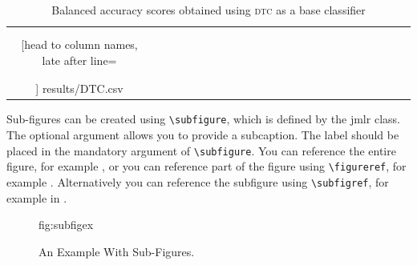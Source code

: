 \documentclass[pmlr]{jmlr}
\begin{document}
\begin{table}
\begin{tabular}{@{}|ccccc|ccccc||ccccc|ccccc||ccc|r|}
	& & & &
	
	\\
	
	&&&&&&&&&&&&&&&&&&&&&&&
	\\\hline\hline
	
	\csvreader[head to column names,
	           late after line=\csvifoddrow{\\}{\\\rowcolor{gray!10!white}},
	           late after last line = \\\hline]
	{results/DTC.csv}{}%
	{
	
	\ereg & \ewei & \ecwei & \enwei & \encwei &
	\eregr & \eweir & \ecweir & \enweir & \encweir &
	\eregos & \eweios & \ecweios & \enweios & \encweios & 
	\eregros & \eweiros & \ecweiros & \enweiros & \encweiros &
	\os & \us & \reg & 
	
	\multicolumn{1}{l|}{\emph{\dataset}}
	
	}%
\end{tabular}
\caption{Balanced accuracy scores obtained using \textsc{dtc} as a base classifier}
\end{table}









Sub-figures can be created using \verb|\subfigure|, which is
defined by the \textsf{jmlr} class. The optional argument allows
you to provide a subcaption. The label should be placed in the
mandatory argument of \verb|\subfigure|. You can reference the
entire figure, for example , or you can
reference part of the figure using \verb|\figureref|, for example
. Alternatively you can reference the
subfigure using \verb|\subfigref|, for example
 in .

\begin{figure}[htbp]
\floatconts
  {fig:subfigex}
  {\caption{An Example With Sub-Figures.}}
  {%
    \qquad
  }
\end{figure}
\end{document}
